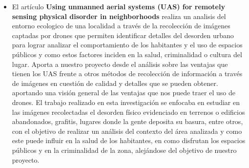 \begin{itemize}
        \item El artículo \textbf{Using unmanned aerial systems (UAS) for remotely sensing physical disorder in neighborhoods }\cite{grubesic_using_2018}  realiza un analisis del entorno ecologico de una localidad a través de la recolección de imágenes captadas por drones que permiten identificar detalles del desorden urbano para lograr analizar el comportamiento de los habitantes y el uso de espacios públicos y como estos factores inciden en la salud, criminalidad o cultura del lugar.
        Aporta a nuestro proyecto desde el análisis sobre las ventajas que tienen los UAS frente a otros métodos de recolección de información a través de imágenes en cuestión de calidad y detalles que se pueden obtener. aportando una visión general de las ventajas que nos puede traer el uso de drones. 
        El trabajo realizado en esta investigación se enfocaba en estudiar en las imágenes recolectadas el desorden físico evidenciado en terrenos o edificios abandonados, grafitis, lugares donde la gente deposita su basura, entre otros, con el objetivo de realizar un análisis del contexto del área analizada y como este puede influir en la salud de los habitantes, en como disfrutan los espacios públicos y en la criminalidad de la zona, alejándose del objetivo de nuestro proyecto.
        \end{itemize}
